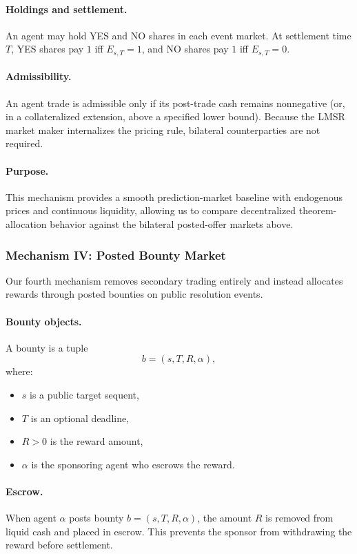 \documentclass[letterpaper]{article} %
\begin{document}
\paragraph{Holdings and settlement.}
An agent may hold YES and NO shares in each event market. At settlement time $T$, YES shares pay $1$ iff $E_{s,T}=1$, and NO shares pay $1$ iff $E_{s,T}=0$.

\paragraph{Admissibility.}
An agent trade is admissible only if its post-trade cash remains nonnegative (or, in a collateralized extension, above a specified lower bound). Because the LMSR market maker internalizes the pricing rule, bilateral counterparties are not required.

\paragraph{Purpose.}
This mechanism provides a smooth prediction-market baseline with endogenous prices and continuous liquidity, allowing us to compare decentralized theorem-allocation behavior against the bilateral posted-offer markets above.

\subsubsection{Mechanism IV: Posted Bounty Market}

Our fourth mechanism removes secondary trading entirely and instead allocates rewards through posted bounties on public resolution events.

\paragraph{Bounty objects.}
A bounty is a tuple
\[
b=(s,T,R,\alpha),
\]
where:
\begin{itemize}
    \item $s$ is a public target sequent,
    \item $T$ is an optional deadline,
    \item $R>0$ is the reward amount,
    \item $\alpha$ is the sponsoring agent who escrows the reward.
\end{itemize}

\paragraph{Escrow.}
When agent $\alpha$ posts bounty $b=(s,T,R,\alpha)$, the amount $R$ is removed from liquid cash and placed in escrow. This prevents the sponsor from withdrawing the reward before settlement.
\end{document}

